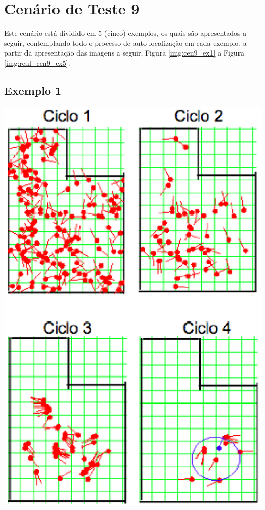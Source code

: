 \section{Cenário de Teste 9}
\label{sec:cenario6}

Este cenário está dividido em 5 (cinco) exemplos, os quais são apresentados a seguir, contemplando todo o processo de auto-localização
em cada exemplo, a partir da apresentação das imagens a seguir, Figura \ref{img:cen9_ex1} a Figura \ref{img:real_cen9_ex5}.

\subsection{Exemplo 1}

{\centering
\includegraphics[scale=0.4]{figuras/cen9_ex1.eps}
\label{img:cen9_ex1}
\par}

